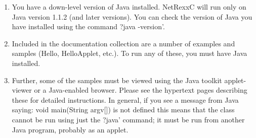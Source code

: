 \begin{enumerate}
\item You have a down-level version of Java installed. NetRexxC will run only on Java version 1.1.2 (and later versions). You can check the version of Java you have installed using the command ?java -version’.
\item Included in the documentation collection are a number of examples and samples (Hello, HelloApplet, etc.). To run any of these, you must have Java installed.
\item Further, some of the samples must be viewed using the Java toolkit applet-viewer or a Java-enabled browser. Please see the hypertext pages describing these for detailed instructions. In general, if you see a message from Java saying:
  void main(String argv[]) is not defined
this means that the class cannot be run using just the ?java’ command; it must be run from another Java program, probably as an applet.
\end{enumerate} 